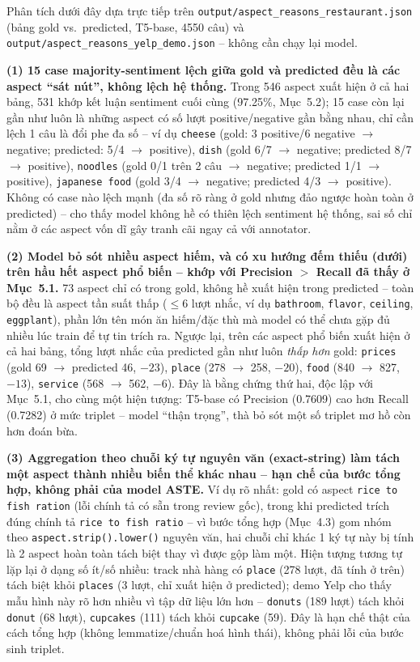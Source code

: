 \documentclass[11pt,a4paper]{article}
\begin{document}
Phân tích dưới đây dựa trực tiếp trên
\texttt{output/\allowbreak aspect\_\allowbreak reasons\_\allowbreak restaurant.json} (bảng gold vs.\ predicted,
T5-base, 4550 câu) và \texttt{output/\allowbreak aspect\_\allowbreak reasons\_\allowbreak yelp\_\allowbreak demo.json} --
không cần chạy lại model.

\textbf{(1) 15 case majority-sentiment lệch giữa gold và predicted đều là
các aspect ``sát nút'', không lệch hệ thống.} Trong 546 aspect xuất hiện ở
cả hai bảng, 531 khớp kết luận sentiment cuối cùng (97.25\%, Mục~5.2); 15
case còn lại gần như luôn là những aspect có số lượt positive/negative gần
bằng nhau, chỉ cần lệch 1 câu là đổi phe đa số -- ví dụ \texttt{cheese}
(gold: 3 positive/6 negative $\to$ negative; predicted: 5/4 $\to$
positive), \texttt{dish} (gold 6/7 $\to$ negative; predicted 8/7 $\to$
positive), \texttt{noodles} (gold 0/1 trên 2 câu $\to$ negative; predicted
1/1 $\to$ positive), \texttt{japanese food} (gold 3/4 $\to$ negative;
predicted 4/3 $\to$ positive). Không có case nào lệch mạnh (đa số rõ ràng
ở gold nhưng đảo ngược hoàn toàn ở predicted) -- cho thấy model không hề
có thiên lệch sentiment hệ thống, sai số chỉ nằm ở các aspect vốn dĩ gây
tranh cãi ngay cả với annotator.

\textbf{(2) Model bỏ sót nhiều aspect hiếm, và có xu hướng đếm thiếu (dưới)
trên hầu hết aspect phổ biến -- khớp với Precision $>$ Recall đã thấy ở
Mục~5.1.} 73 aspect chỉ có trong gold, không hề xuất hiện trong predicted
-- toàn bộ đều là aspect tần suất thấp ($\leq 6$ lượt nhắc, ví dụ
\texttt{bathroom}, \texttt{flavor}, \texttt{ceiling}, \texttt{eggplant}),
phần lớn tên món ăn hiếm/đặc thù mà model có thể chưa gặp đủ nhiều lúc
train để tự tin trích ra. Ngược lại, trên các aspect phổ biến xuất hiện ở
cả hai bảng, tổng lượt nhắc của predicted gần như luôn \emph{thấp hơn}
gold: \texttt{prices} (gold 69 $\to$ predicted 46, $-23$), \texttt{place}
(278 $\to$ 258, $-20$), \texttt{food} (840 $\to$ 827, $-13$),
\texttt{service} (568 $\to$ 562, $-6$). Đây là bằng chứng thứ hai, độc lập
với Mục~5.1, cho cùng một hiện tượng: T5-base có Precision (0.7609) cao
hơn Recall (0.7282) ở mức triplet -- model ``thận trọng'', thà bỏ sót một
số triplet mơ hồ còn hơn đoán bừa.

\textbf{(3) Aggregation theo chuỗi ký tự nguyên văn (exact-string) làm
tách một aspect thành nhiều biến thể khác nhau -- hạn chế của bước tổng
hợp, không phải của model ASTE.} Ví dụ rõ nhất: gold có aspect
\texttt{rice to fish ration} (lỗi chính tả có sẵn trong review gốc), trong
khi predicted trích đúng chính tả \texttt{rice to fish ratio} -- vì bước
tổng hợp (Mục~4.3) gom nhóm theo \texttt{aspect.strip().lower()} nguyên
văn, hai chuỗi chỉ khác 1 ký tự này bị tính là 2 aspect hoàn toàn tách
biệt thay vì được gộp làm một. Hiện tượng tương tự lặp lại ở dạng số
ít/số nhiều: track nhà hàng có \texttt{place} (278 lượt, đã tính ở trên)
tách biệt khỏi \texttt{places} (3 lượt, chỉ xuất hiện ở predicted); demo
Yelp cho thấy mẫu hình này rõ hơn nhiều vì tập dữ liệu lớn hơn --
\texttt{donuts} (189 lượt) tách khỏi \texttt{donut} (68 lượt),
\texttt{cupcakes} (111) tách khỏi \texttt{cupcake} (59). Đây là hạn chế
thật của cách tổng hợp (không lemmatize/chuẩn hoá hình thái), không phải
lỗi của bước sinh triplet.
\end{document}
